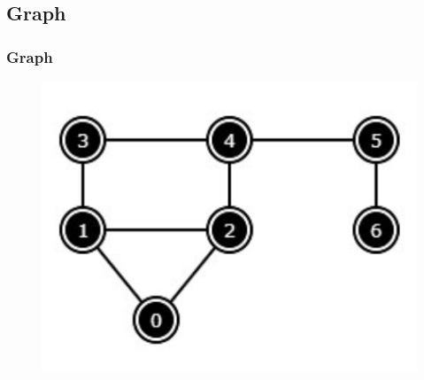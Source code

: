 \documentclass{beamer}
\begin{document}
\subsection{Graph}
\begin{frame}[fragile]
\frametitle{Graph}
	\begin{figure}
		\centering
		\includegraphics[scale=0.5]{imgs/2.4/graph/graph.png}
	\end{figure}	
\end{frame}
\end{document}
